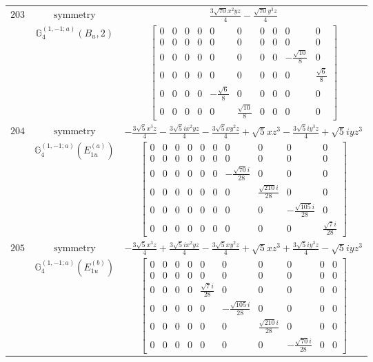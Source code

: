 \documentclass[fleqn,8pt,landscape]{jsarticle}
\begin{document}
\begin{longtable}{ccc}
$ 203 $ & $ \text{symmetry} $ & $ \frac{3 \sqrt{70} x^{2} y z}{4} - \frac{\sqrt{70} y^{3} z}{4} $ \\
$  $ & $ \mathbb{G}_{4}^{(1,-1;a)}(B_{u},2) $ & $ \begin{bmatrix} 0 & 0 & 0 & 0 & 0 & 0 & 0 & 0 & 0 & 0 \\ 0 & 0 & 0 & 0 & 0 & 0 & 0 & 0 & 0 & 0 \\ 0 & 0 & 0 & 0 & 0 & 0 & 0 & 0 & - \frac{\sqrt{10}}{8} & 0 \\ 0 & 0 & 0 & 0 & 0 & 0 & 0 & 0 & 0 & \frac{\sqrt{6}}{8} \\ 0 & 0 & 0 & 0 & - \frac{\sqrt{6}}{8} & 0 & 0 & 0 & 0 & 0 \\ 0 & 0 & 0 & 0 & 0 & \frac{\sqrt{10}}{8} & 0 & 0 & 0 & 0 \end{bmatrix} $ \\ \hline
$ 204 $ & $ \text{symmetry} $ & $ - \frac{3 \sqrt{5} x^{3} z}{4} - \frac{3 \sqrt{5} i x^{2} y z}{4} - \frac{3 \sqrt{5} x y^{2} z}{4} + \sqrt{5} x z^{3} - \frac{3 \sqrt{5} i y^{3} z}{4} + \sqrt{5} i y z^{3} $ \\
$  $ & $ \mathbb{G}_{4}^{(1,-1;a)}(E_{1u}^{(a)}) $ & $ \begin{bmatrix} 0 & 0 & 0 & 0 & 0 & 0 & 0 & 0 & 0 & 0 \\ 0 & 0 & 0 & 0 & 0 & 0 & 0 & 0 & 0 & 0 \\ 0 & 0 & 0 & 0 & 0 & 0 & - \frac{\sqrt{70} i}{28} & 0 & 0 & 0 \\ 0 & 0 & 0 & 0 & 0 & 0 & 0 & \frac{\sqrt{210} i}{28} & 0 & 0 \\ 0 & 0 & 0 & 0 & 0 & 0 & 0 & 0 & - \frac{\sqrt{105} i}{28} & 0 \\ 0 & 0 & 0 & 0 & 0 & 0 & 0 & 0 & 0 & \frac{\sqrt{7} i}{28} \end{bmatrix} $ \\ \hline
$ 205 $ & $ \text{symmetry} $ & $ - \frac{3 \sqrt{5} x^{3} z}{4} + \frac{3 \sqrt{5} i x^{2} y z}{4} - \frac{3 \sqrt{5} x y^{2} z}{4} + \sqrt{5} x z^{3} + \frac{3 \sqrt{5} i y^{3} z}{4} - \sqrt{5} i y z^{3} $ \\
$  $ & $ \mathbb{G}_{4}^{(1,-1;a)}(E_{1u}^{(b)}) $ & $ \begin{bmatrix} 0 & 0 & 0 & 0 & 0 & 0 & 0 & 0 & 0 & 0 \\ 0 & 0 & 0 & 0 & 0 & 0 & 0 & 0 & 0 & 0 \\ 0 & 0 & 0 & 0 & \frac{\sqrt{7} i}{28} & 0 & 0 & 0 & 0 & 0 \\ 0 & 0 & 0 & 0 & 0 & - \frac{\sqrt{105} i}{28} & 0 & 0 & 0 & 0 \\ 0 & 0 & 0 & 0 & 0 & 0 & \frac{\sqrt{210} i}{28} & 0 & 0 & 0 \\ 0 & 0 & 0 & 0 & 0 & 0 & 0 & - \frac{\sqrt{70} i}{28} & 0 & 0 \end{bmatrix} $ \\ \hline

\end{longtable}
\end{document}

